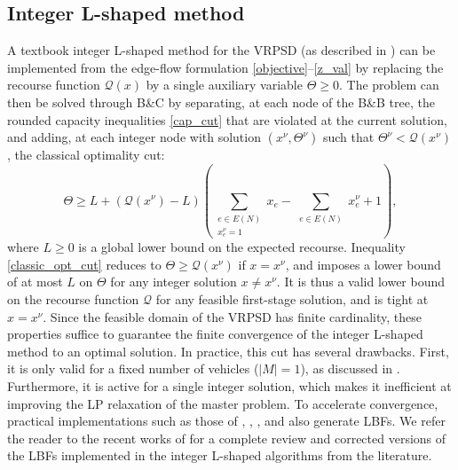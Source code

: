 \documentclass{article}
\newcommand{\rev}[1]{{\color{black}#1}}
\begin{document}
\subsection{Integer L-shaped method}\label{sec:analysis_DL_shaped:L-shaped}
A textbook integer L-shaped method for the VRPSD (as described in \cite{laporte1998solving}) can be implemented from the edge-flow formulation \eqref{objective}--\eqref{z_val} by replacing the recourse function $\mathcal{Q}(x)$ by a single auxiliary variable $\Theta \geq 0$. The problem can then be solved through B\&C by \rev{separating, at each node of the B\&B tree, the rounded capacity inequalities \eqref{cap_cut} that are violated at the current solution}, and adding, at each integer node with solution $(x^{\nu}, \Theta^{\nu})$ such that $\Theta^{\nu} < \mathcal{Q}(x^{\nu})$, the classical optimality cut:
\begin{equation} \label{classic_opt_cut}
    \Theta \geq L + (\mathcal{Q}(x^{\nu}) - L) \left( \sum_{\substack{e \in E(N) \\x^{\nu}_{e}=1}}x_{e} - \sum_{\substack{e \in E(N)}}x^{\nu}_{e} + 1 \right),
\end{equation}
where $L \geq 0$ is a global lower bound on the expected recourse. Inequality \eqref{classic_opt_cut} reduces to $\Theta \geq \mathcal{Q}(x^{\nu})$ if $x=x^{\nu}$, and imposes a lower bound of at most $L$ on $\Theta$ for any integer solution $x \neq x^{\nu}$. It is thus a valid lower bound on the recourse function $\mathcal{Q}$ for any feasible first-stage solution, and is tight at $x=x^{\nu}$. Since the feasible domain of the VRPSD has finite cardinality, these properties suffice to guarantee the finite convergence of the integer L-shaped method to an optimal solution. In practice, this cut has several drawbacks. First, it is only valid for a fixed number of vehicles ($|M|=1$), as discussed in \cite{hoogendoorn2025evaluation}. Furthermore, it is active for a single integer solution, which makes it inefficient at improving the LP relaxation of the master problem. To accelerate convergence, practical implementations such as those of \cite{laporte2002integer}, \cite{jabali2014partial}, \cite{louveaux2018exact}, and \cite{salavati2019exact} also generate LBFs. We refer the reader to the recent works of \cite{hoogendoorn2023improved, hoogendoorn2025evaluation} for a complete review and corrected versions of the LBFs implemented in the integer L-shaped algorithms from the literature. 

\end{document}
